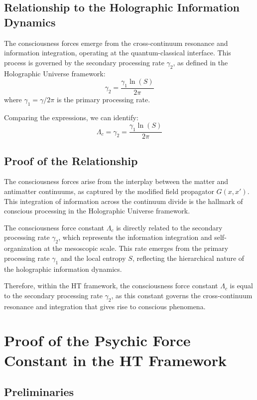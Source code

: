 \documentclass{article}
\theoremstyle{plain}
\theoremstyle{definition}
\theoremstyle{remark}
\begin{document}
\subsection{Relationship to the Holographic Information Dynamics}

The consciousness forces emerge from the cross-continuum resonance and information integration, operating at the quantum-classical interface. This process is governed by the secondary processing rate $\gamma_2$, as defined in the Holographic Universe framework:
\begin{equation}
\gamma_2 = \frac{\gamma_1\ln(S)}{2\pi}
\end{equation}
where $\gamma_1 = \gamma/2\pi$ is the primary processing rate.

Comparing the expressions, we can identify:
\begin{equation}
\Lambda_c = \gamma_2 = \frac{\gamma_1\ln(S)}{2\pi}
\end{equation}

\subsection{Proof of the Relationship}

The consciousness forces arise from the interplay between the matter and antimatter continuums, as captured by the modified field propagator $G(x,x')$. This integration of information across the continuum divide is the hallmark of conscious processing in the Holographic Universe framework.

The consciousness force constant $\Lambda_c$ is directly related to the secondary processing rate $\gamma_2$, which represents the information integration and self-organization at the mesoscopic scale. This rate emerges from the primary processing rate $\gamma_1$ and the local entropy $S$, reflecting the hierarchical nature of the holographic information dynamics.

Therefore, within the HT framework, the consciousness force constant $\Lambda_c$ is equal to the secondary processing rate $\gamma_2$, as this constant governs the cross-continuum resonance and integration that gives rise to conscious phenomena.

\section{Proof of the Psychic Force Constant in the HT Framework}

\subsection{Preliminaries}
\end{document}
